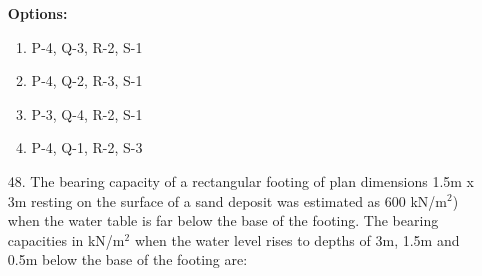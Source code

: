\documentclass[journal]{IEEEtran}
\begin{document}
\begin{enumerate}
  \textbf{Options:}
  
  \begin{enumerate}[label=\Alph*]
      \item P-4, Q-3, R-2, S-1
      \item P-4, Q-2, R-3, S-1
      \item P-3, Q-4, R-2, S-1
      \item P-4, Q-1, R-2, S-3
  \end{enumerate}
  \item [48.] The bearing capacity of a rectangular footing of plan dimensions 1.5m x 3m resting on the surface of a sand deposit was estimated as 600 kN/m$^2$) when the water table is far below the base of the footing. The bearing capacities in kN/m\(^2\) when the water level rises to depths of 3m, 1.5m and 0.5m below the base of the footing are:


\end{enumerate}
\end{document}
